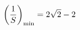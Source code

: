 \documentclass[preview]{standalone}
\begin{document}
\begin{align*}
\special{dvisvgm:raw <g id='unique000'>}\left(\frac{1}{S}\right)_{\min}=2\sqrt2-2\special{dvisvgm:raw </g>}
\end{align*}
\end{document}
